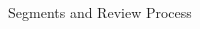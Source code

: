 \documentclass[final,hyperref={pdfpagelabels=false}]{beamer}
\begin{document}
\begin{frame}[fragile]{}
\begin{columns}[t]
\begin{column}{.31\linewidth}
\begin{block}{Segments and Review Process}
\begin{comment}
  \begin{subblock}{Vectors Functions}
    \begin{columns}[t]
      \hspace{4ex}
      \begin{column}{0.55\linewidth}
        \inlc{sort(x)}\\Return x sorted.\br
        \inlc{table(x)}\\See counts of values.
      \end{column}
      \begin{column}{0.49\linewidth}
        \inlc{rev(x)}\\Return x reversed.\br
        \inlc{unique(x)}\\See unique values.
      \end{column}
      \hspace{4ex}
    \end{columns}
  \end{subblock}
  
  \begin{subblock}{Selecting Vector Elements}
    \renewcommand{\arraystretch}{1.411}\hspace{-17.5pt}
    \begin{tabular}{>{\centering}m{0.48\linewidth} >{\centering\arraybackslash}m{0.47\linewidth}}
      \multicolumn{2}{c}{\textcolor{gray}{\textbf{By Position}}}\\
      \inlc{x[4]} & The fourth element.\\
      \inlc{x[-4]} & All but the fourth.\\
      \inlc{x[2:4]} & Elements two to four.\\
      \inlc{x[-(2:4)]} & All elements except two to four.\\
      \inlc{x[c(1, 5)]} & Elements one and five.\\
      \multicolumn{2}{c}{\textcolor{gray}{\textbf{By Value}}}\\
      \inlc{x[x == 10]} & Element which are equal to 10.\\
      \inlc{x[which(x==10)]} & Element which are equal to 10.\\
      \inlc{x[x < 0]} & All elements less than zero.\\
      \inlc{x[x\%in\%c(1,2,5)]} & Elements in the set \{1, 2, 5\}.\\
      \multicolumn{2}{c}{\textcolor{gray}{\textbf{Named Vectors}}}\\
      \inlc{x['apple']} & Element with name 'apple".
    \end{tabular}
  \end{subblock}
	  \end{comment}
\end{block}
      \end{column}
      

\end{columns}
\end{frame}
\end{document}
